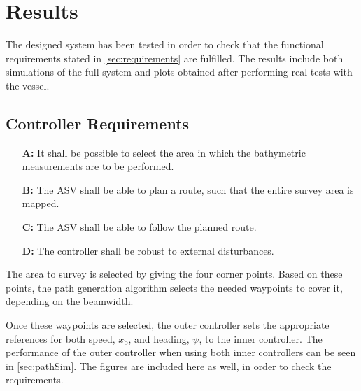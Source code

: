 \chapter{Results}\label{chap:results}
The designed system has been tested in order to check that the functional requirements stated in \autoref{sec:requirements} are fulfilled. The results include both simulations of the full system and plots obtained after performing real tests with the vessel.

\section{Controller Requirements}
\begin{itemize}
  \item[\textbf{A:}] It shall be possible to select the area in which the bathymetric measurements are to be performed.
  \item[\textbf{B:}] The ASV shall be able to plan a route, such that the entire survey area is mapped.
  \item[\textbf{C:}] The ASV shall be able to follow the planned route.
  \item[\textbf{D:}] The controller shall be robust to external disturbances.
\end{itemize}

The area to survey is selected by giving the four corner points. Based on these points, the path generation algorithm selects the needed waypoints to cover it, depending on the beamwidth.

Once these waypoints are selected, the outer controller sets the appropriate references for both speed, $\dot{x}_\mathrm{b}$, and heading, $\psi$, to the inner controller. The performance of the outer controller when using both inner controllers can be seen in \autoref{sec:pathSim}. The figures are included here as well, in order to check the requirements.

